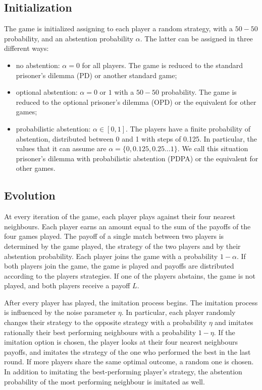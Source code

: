 \documentclass[12pt,oneside,a4paper,fleqn]{article}
\begin{document}
\subsection{Initialization}
The game is initialized assigning to each player a random strategy, with a $50-50$ probability, and an abstention probability $\alpha$. The latter can be assigned in three different ways:
\begin{itemize}
    \item no abstention: $\alpha = 0$ for all players. The game is reduced to the standard prisoner's dilemma (PD) or another standard game;
    \item optional abstention: $\alpha = 0$ or $1$ with a $50-50$ probability. The game is reduced to the optional prisoner's dilemma (OPD) or the equivalent for other games;
    \item probabilistic abstention: $\alpha \in [0,1]$. The players have a finite probability of abstention, distributed between 0 and 1 with steps of 0.125. In particular, the values that it can assume are
          $\alpha = \{0, 0.125, 0.25 \dots 1 \}$.
          We call this situation prisoner's dilemma with probabilistic abstention (PDPA) or the equivalent for other games.
\end{itemize}
\subsection{Evolution}
At every iteration of the game, each player plays against their four nearest neighbours.
Each player earns an amount equal to the sum of the payoffs of the four games played.
The payoff of a single match between two players is determined by the game played, the strategy of the two players and by their abstention probability.
Each player joins the game with a probability $1-\alpha$.
If both players join the game, the game is played and payoffs are distributed according to the players strategies.
If one of the players abstains, the game is not played, and both players receive a payoff $L$.

After every player has played, the imitation process begins.
The imitation process is influenced by the noise parameter $\eta$.
In particular, each player randomly changes their strategy to the opposite strategy with a probability $\eta$ and imitates rationally their best performing neighbours with a probability $1-\eta$.
If the imitation option is chosen, the player looks at their four nearest neighbours payoffs, and imitates the strategy of the one who performed the best in the last round.
If more players share the same optimal outcome, a random one is chosen.
In addition to imitating the best-performing player's strategy, the abstention probability of the most performing neighbour is imitated as well.
\end{document}
